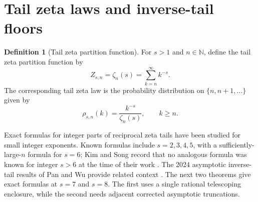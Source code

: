 \documentclass[11pt]{article}
\numberwithin{equation}{section}
\theoremstyle{definition}
\newtheorem{definition}[theorem]{Definition}
\theoremstyle{remark}
\newcommand{\N}{\mathbb N}
\newcommand{\1}{\mathbf 1}
\begin{document}
\section{Tail zeta laws and inverse-tail floors}

\begin{definition}[Tail zeta partition function]
\label{def:tail-zeta-partition}
For \(s>1\) and \(n\in\N\), define the tail zeta partition function by
\begin{equation}
\label{eq:tail-zeta-partition}
Z_{s,n}=\zeta_n(s)=\sum_{k=n}^{\infty}k^{-s}.
\end{equation}
The corresponding tail zeta law is the probability distribution on \(\{n,n+1,\ldots\}\) given by
\begin{equation}
\label{eq:tail-zeta-law}
\rho_{s,n}(k)=\frac{k^{-s}}{\zeta_n(s)},\qquad k\ge n.
\end{equation}
\end{definition}

Exact formulas for integer parts of reciprocal zeta tails have been studied for small integer exponents.  Known formulas include \(s=2,3,4,5\), with a sufficiently-large-\(n\) formula for \(s=6\); Kim and Song record that no analogous formula was known for integer \(s>6\) at the time of their work \cite{kim-song-tail}.  The 2024 asymptotic inverse-tail results of Pan and Wu provide related context \cite{pan-wu-tail}.  The next two theorems give exact formulas at \(s=7\) and \(s=8\).  The first uses a single rational telescoping enclosure, while the second needs adjacent corrected asymptotic truncations.
\end{document}
